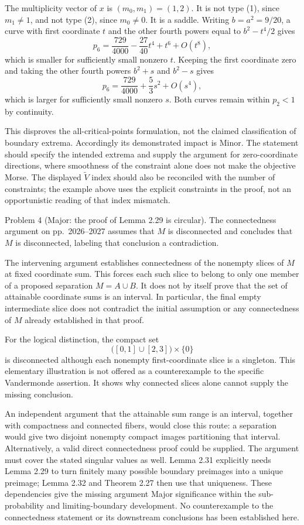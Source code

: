 \documentclass[10pt]{article}
\begin{document}
The multiplicity vector of \(x\) is \((m_0,m_1)=(1,2)\). It is not type (1), since \(m_1\neq1\), and not type (2), since \(m_0\neq0\). It is a saddle. Writing \(b=a^2=9/20\), a curve with first coordinate \(t\) and the other fourth powers equal to \(b^2-t^4/2\) gives \[p_6=\frac{729}{4000}-\frac{27}{40}t^4+t^6+O(t^8),\] which is smaller for sufficiently small nonzero \(t\). Keeping the first coordinate zero and taking the other fourth powers \(b^2+s\) and \(b^2-s\) gives \[p_6=\frac{729}{4000}+\frac53s^2+O(s^4),\] which is larger for sufficiently small nonzero \(s\). Both curves remain within \(p_2<1\) by continuity.\par
This disproves the all-critical-points formulation, not the claimed classification of boundary extrema. Accordingly its demonstrated impact is Minor. The statement should specify the intended extrema and supply the argument for zero-coordinate directions, where smoothness of the constraint alone does not make the objective Morse. The displayed \(\widetilde V\) index should also be reconciled with the number of constraints; the example above uses the explicit constraints in the proof, not an opportunistic reading of that index mismatch.\par
Problem 4 (Major: the proof of Lemma 2.29 is circular).  The connectedness argument on pp. 2026–2027 assumes that \(M\) is disconnected and concludes that \(M\) is disconnected, labeling that conclusion a contradiction.\par
The intervening argument establishes connectedness of the nonempty slices of \(M\) at fixed coordinate sum. This forces each such slice to belong to only one member of a proposed separation \(M=A\cup B\). It does not by itself prove that the set of attainable coordinate sums is an interval. In particular, the final empty intermediate slice does not contradict the initial assumption or any connectedness of \(M\) already established in that proof.\par
For the logical distinction, the compact set \[\bigl([0,1]\cup[2,3]\bigr)\times\{0\}\] is disconnected although each nonempty first-coordinate slice is a singleton. This elementary illustration is not offered as a counterexample to the specific Vandermonde assertion. It shows why connected slices alone cannot supply the missing conclusion.\par
An independent argument that the attainable sum range is an interval, together with compactness and connected fibers, would close this route: a separation would give two disjoint nonempty compact images partitioning that interval. Alternatively, a valid direct connectedness proof could be supplied. The argument must cover the stated singular values as well. Lemma 2.31 explicitly needs Lemma 2.29 to turn finitely many possible boundary preimages into a unique preimage; Lemma 2.32 and Theorem 2.27 then use that uniqueness. These dependencies give the missing argument Major significance within the sub-probability and limiting-boundary development. No counterexample to the connectedness statement or its downstream conclusions has been established here.\par
\end{document}
